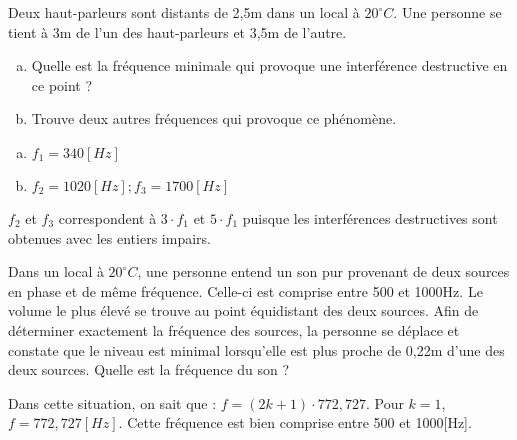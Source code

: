 \begin{exercise}
    Deux haut-parleurs sont distants de 2,5m dans un local à \(20 ^ \circ C\). Une personne se tient à 3m de l'un des haut-parleurs et 3,5m de l'autre.
    \begin{enumerate}[a)]
        \item Quelle est la fréquence minimale qui provoque une interférence destructive en ce point ?
        \item Trouve deux autres fréquences qui provoque ce phénomène.
    \end{enumerate}
\end{exercise}
\begin{solution}
    \begin{enumerate}[a)]
        \item \(f_1=340[Hz]\)
        \item \(f_2=1020[Hz] ; f_3=1700[Hz]\)
    \end{enumerate}
    \(f_2\) et \(f_3\) correspondent à \(3 \cdot f_1\) et \(5 \cdot f_1\) puisque les interférences destructives sont obtenues avec les entiers impairs.
\end{solution}


\begin{exercise}
    Dans un local à \(20 ^\circ C\), une personne entend un son pur provenant de deux sources en phase et de même fréquence. Celle-ci est comprise entre 500 et 1000Hz. Le volume le plus élevé se trouve au point équidistant des deux sources. Afin de déterminer exactement la fréquence des sources, la personne se déplace et constate que le niveau est minimal lorsqu'elle est plus proche de 0,22m d'une des deux sources. Quelle est la fréquence du son ?
\end{exercise}
\begin{solution}
    Dans cette situation, on sait que : \(f=(2k+1) \cdot 772,727\).
    Pour \(k=1\), \(f=772,727[Hz]\). Cette fréquence est bien comprise entre 500 et 1000[Hz].
\end{solution}